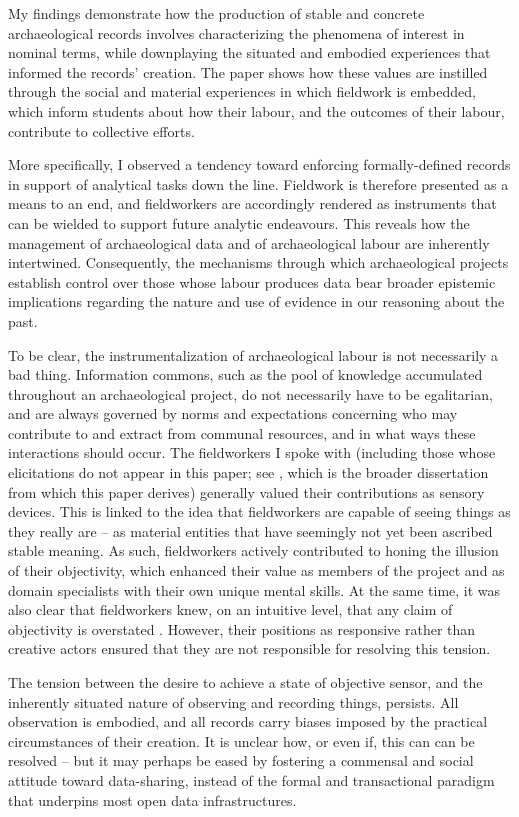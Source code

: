 My findings demonstrate how the production of stable and concrete archaeological records involves characterizing the phenomena of interest in nominal terms, while downplaying the situated and embodied experiences that informed the records' creation.
The paper shows how these values are instilled through the social and material experiences in which fieldwork is embedded, which inform students about how their labour, and the outcomes of their labour, contribute to collective efforts.

More specifically, I observed a tendency toward enforcing formally-defined records in support of analytical tasks down the line.
Fieldwork is therefore presented as a means to an end, and fieldworkers are accordingly rendered as instruments that can be wielded to support future analytic endeavours.
This reveals how the management of archaeological data and of archaeological labour are inherently intertwined.
Consequently, the mechanisms through which archaeological projects establish control over those whose labour produces data bear broader epistemic implications regarding the nature and use of evidence in our reasoning about the past.

To be clear, the instrumentalization of archaeological labour is not necessarily a bad thing.
Information commons, such as the pool of knowledge accumulated throughout an archaeological project, do not necessarily have to be egalitarian, and are always governed by norms and expectations concerning who may contribute to and extract from communal resources, and in what ways these interactions should occur.
The fieldworkers I spoke with (including those whose elicitations do not appear in this paper; see \cite{batist2023a}, which is the broader dissertation from which this paper derives) generally valued their contributions as sensory devices.
This is linked to the idea that fieldworkers are capable of seeing things as they really are -- as material entities that have seemingly not yet been ascribed stable meaning.
As such, fieldworkers actively contributed to honing the illusion of their objectivity, which enhanced their value as members of the project and as domain specialists with their own unique mental skills.
At the same time, it was also clear that fieldworkers knew, on an intuitive level, that any claim of objectivity is overstated \parencite[12]{batist2024a}.
However, their positions as responsive rather than creative actors \parencite[cf.][]{batist-alienation} ensured that they are not responsible for resolving this tension.

The tension between the desire to achieve a state of objective sensor, and the inherently situated nature of observing and recording things, persists.
All observation is embodied, and all records carry biases imposed by the practical circumstances of their creation.
It is unclear how, or even if, this can can be resolved -- but it may perhaps be eased by fostering a commensal and social attitude toward data-sharing, instead of the formal and transactional paradigm that underpins most open data infrastructures.


